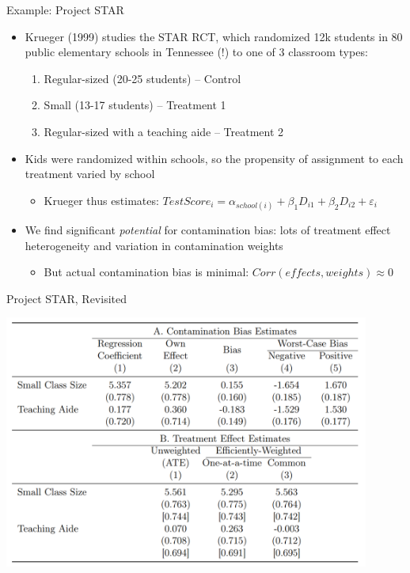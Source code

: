\documentclass[11pt,english]{beamer}
\begin{document}
\begin{frame}{Example: Project STAR}

\begin{itemize}
\item Krueger (1999) studies the STAR RCT, which randomized 12k students in 80 public elementary schools in Tennessee (!) to one of 3 classroom types:\smallskip
\begin{enumerate}
\item Regular-sized (20-25 students) -- Control\smallskip
\item Small (13-17 students) -- Treatment 1\smallskip
\item Regular-sized with a teaching aide -- Treatment 2
\end{enumerate}\bigskip\pause{}

\item Kids were randomized within schools, so the propensity of assignment to each treatment varied by school\smallskip
\begin{itemize}
\item Krueger thus estimates: $TestScore_i= \alpha_{school(i)}+\beta_1 D_{i1} + \beta_2 D_{i2} +\varepsilon_i$
\end{itemize}\bigskip\pause{}

\item We find significant \emph{potential} for contamination bias: lots of treatment effect heterogeneity and variation in contamination weights\smallskip
\begin{itemize}
\item But actual contamination bias is minimal: $Corr(effects,weights)\approx 0$
\end{itemize}
\end{itemize}

\end{frame}

\begin{frame}{Project STAR, Revisited}

\begin{center}
	\includegraphics[width=0.9\textwidth]{figures/STAR_CB.png}
\end{center}

\end{frame}
\end{document}
